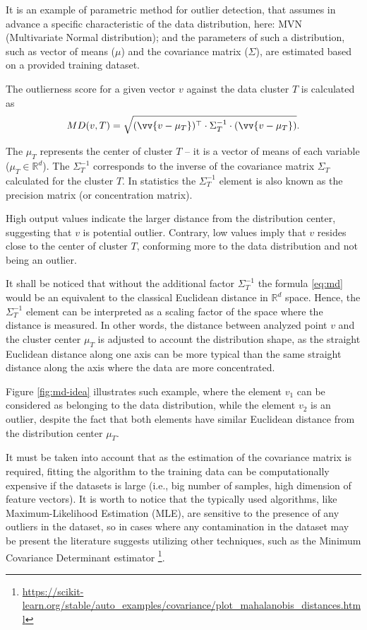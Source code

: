 It is an example of parametric method for outlier detection, that assumes in advance a specific characteristic of the data distribution, here: MVN (Multivariate Normal distribution); and the parameters of such a distribution, such as vector of means ($\mu$) and the covariance matrix ($\Sigma$), are estimated based on a provided training dataset.

The outlierness score for a given vector $v$ against the data cluster $T$ is calculated as
\begin{equation}
    MD(v, T) = \sqrt{
        (\vv{v - \mu_{T}})^{\top}
        \cdot
        \Sigma_{T}^{-1}
        \cdot
        (\vv{v - \mu_{T}})
    }.
    \label{eq:md}
\end{equation}

The $\mu_{T}$ represents the center of cluster $T$ – it is a vector of means of each variable ($\mu_{T} \in \mathbb{R}^d$). The $\Sigma_{T}^{-1}$ corresponds to the inverse of the covariance matrix $\Sigma_{T}$ calculated for the cluster $T$. In statistics the $\Sigma_{T}^{-1}$ element is also known as the precision matrix \cite{Wasserman-2010} (or concentration matrix).

High output values indicate the larger distance from the distribution center, suggesting that $v$ is potential outlier. Contrary, low values imply that $v$ resides close to the center of cluster $T$, conforming more to the data distribution and not being an outlier.

It shall be noticed that without the additional factor $\Sigma_{T}^{-1}$ the formula \ref{eq:md} would be an equivalent to the classical Euclidean distance in $\mathbb{R}^d$ space. Hence, the  $\Sigma_{T}^{-1}$ element can be interpreted as a scaling factor of the space where the distance is measured. In other words, the distance between analyzed point $v$ and the cluster center $\mu_{T}$ is adjusted to account the distribution shape, as the straight Euclidean distance along one axis can be more typical than the same straight distance along the axis where the data are more concentrated.

Figure \ref{fig:md-idea} illustrates such example, where the element $v_1$ can be considered as belonging to the data distribution, while the element $v_2$ is an outlier, despite the fact that both elements have similar Euclidean distance from the distribution center $\mu_{T}$.

It must be taken into account that as the estimation of the covariance matrix is required, fitting the algorithm to the training data can be computationally expensive if the datasets is large (i.e., big number of samples, high dimension of feature vectors). It is worth to notice that the typically used algorithms, like Maximum-Likelihood Estimation (MLE), are sensitive to the presence of any outliers in the dataset, so in cases where any contamination in the dataset may be present the literature suggests utilizing other techniques, such as the Minimum Covariance Determinant estimator \cite{Rousseeuw-1984}\cite{scikit-learn}\footnote{\scriptsize\url{https://scikit-learn.org/stable/auto_examples/covariance/plot_mahalanobis_distances.html}}.

